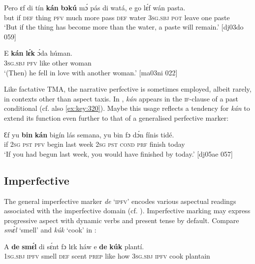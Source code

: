 \ea%
    \label{ex:key:326}
    \gll Pero    ɛf  di  tín    \textbf{kán} \textbf{bɔkú}  mɔ́    pás  di  watá,
e    go  lɛ́f    wán    pasta.\\
but    if  \textsc{def}  thing  \textsc{pfv}  much  more  pass  \textsc{def}  water
\textsc{3sg.sbj}  \textsc{pot}  leave  one    paste\\

\glt ‘But if the thing has become more than the water, a paste will remain.’ [dj03do 059]
\z


\ea%
    \label{ex:key:327}
    \gll E    \textbf{kán}  \textbf{lɛ́k}  ɔ́da    húman.\\
\textsc{3sg.sbj}  \textsc{pfv}  like  other  woman\\

\glt ‘(Then) he fell in love with another woman.’ [ma03ni 022]
\z

Like factative TMA, the narrative perfective is sometimes employed, albeit rarely, in contexts other than aspect taxis. In , \textit{kán} appears in the \textsc{if-}clause of a past conditional (cf. also \ref{ex:key:320}). Maybe this usage reflects a tendency for \textit{kán} to extend its function even further to that of a generalised perfective marker: 


\ea%
    \label{ex:key:328}
    \gll Ɛf  yu  \textbf{bin}  \textbf{kán} bigín  lás  semana,  yu  bin  fɔ    dɔ́n  fínis    tidé.\\
if  \textsc{2sg}  \textsc{pst}  \textsc{pfv}  begin  last  week  \textsc{2sg}  \textsc{pst}  \textsc{cond}    \textsc{prf}  finish  today\\

\glt ‘If you had begun last week, you would have finished by today.’ [dj05ae 057]
\z

\subsection{Imperfective}\label{sec:6.3.4}

The general imperfective marker \textit{de} ‘\textsc{ipfv}’ encodes various aspectual readings associated with the imperfective domain (cf. ). Imperfective marking may express progressive aspect with dynamic verbs and present tense{\fff} by default. Compare \textit{smɛ́l} ‘smell’ and \textit{kúk} ‘cook’ in : 


\ea%
    \label{ex:key:329}
    \gll A    \textbf{de}  \textbf{smɛ́l}  di  sɛ́nt    fɔ  lɛk  háw    e    \textbf{de}  \textbf{kúk}    plantí.\\
\textsc{1sg.sbj}  \textsc{ipfv}  smell  \textsc{def}  scent  \textsc{prep}  like  how    \textsc{3sg.sbj}  \textsc{ipfv}  cook  plantain\\

